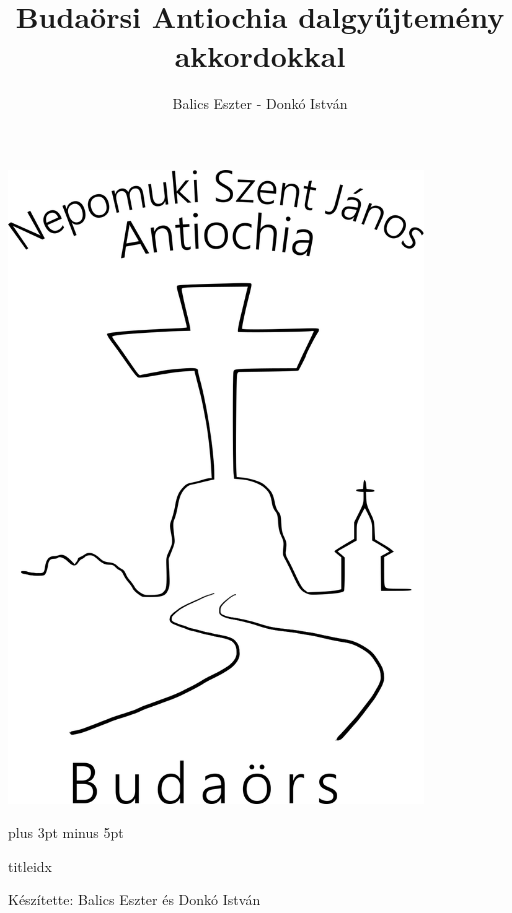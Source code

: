 \documentclass[a5paper,twoside]{article}
\title{Budaörsi Antiochia dalgyűjtemény akkordokkal}
\author{Balics Eszter - Donkó István}
\renewcommand{\_}[1]{\underline{#1}} %
\begin{document}
  \begin{titlepage}
    \setlength{\oddsidemargin}{-1.3cm}

    \vspace*{0.75cm}
    \includegraphics[width=11cm]{Logo_07_final}

    \thispagestyle{empty}
  \end{titlepage}

  \renewcommand{\idxtitlefont}{\sffamily}
  \renewcommand{\idxlyricfont}{\rmfamily\slshape}

  \versesep=12pt plus 3pt minus 5pt

  \begin{songs}{titleidx}
    
  \end{songs}

  \renewcommand{\thesongnum}{K\arabic{songnum}}
  \begin{songs}{}
    
  \end{songs}

  \renewcommand{\thesongnum}{M\arabic{songnum}}
  \setlength{\songnumwidth}{1.25cm}
  \begin{songs}{}
    
  \end{songs}

  \newpage
  \thispagestyle{empty}

  \vspace*{\fill}
  Készítette: Balics Eszter és Donkó István
\end{document}

